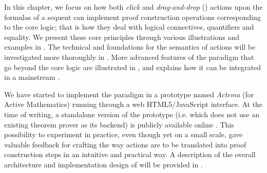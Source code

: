 


In this chapter, we focus on how both \emph{click} and \emph{drag-and-drop}
() actions upon the formulas of a sequent can implement proof construction
operations corresponding to the core logic; that is how they deal with logical
connectives, quantifiers and equality. We present these core principles through
various illustrations and examples in . The technical and
 foundations for the semantics of  actions
will be investigated more thoroughly in .
More advanced features of the  paradigm that go beyond the core
logic are illustrated in , and  explains how it
can be integrated in a mainstream .

We have started to implement the paradigm in a prototype named {\em Actema} (for
Active Mathematics) running through a web HTML5/JavaScript interface. At the
time of writing, a standalone version of the prototype (i.e. which does not use
an existing theorem prover as its backend) is publicly available online
\cite{Actema:link}. This possibility to experiment in practice,
even though yet on a small scale, gave valuable feedback for crafting the way
 actions are to be translated into proof construction steps in an intuitive
and practical way. A description of the overall architecture and implementation
design of  will be provided in .

